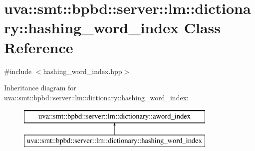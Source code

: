 \hypertarget{classuva_1_1smt_1_1bpbd_1_1server_1_1lm_1_1dictionary_1_1hashing__word__index}{}\section{uva\+:\+:smt\+:\+:bpbd\+:\+:server\+:\+:lm\+:\+:dictionary\+:\+:hashing\+\_\+word\+\_\+index Class Reference}
\label{classuva_1_1smt_1_1bpbd_1_1server_1_1lm_1_1dictionary_1_1hashing__word__index}


{\ttfamily \#include $<$hashing\+\_\+word\+\_\+index.\+hpp$>$}

Inheritance diagram for uva\+:\+:smt\+:\+:bpbd\+:\+:server\+:\+:lm\+:\+:dictionary\+:\+:hashing\+\_\+word\+\_\+index\+:\begin{figure}[H]
\begin{center}
\leavevmode
\includegraphics[height=2.000000cm]{classuva_1_1smt_1_1bpbd_1_1server_1_1lm_1_1dictionary_1_1hashing__word__index}
\end{center}
\end{figure}
